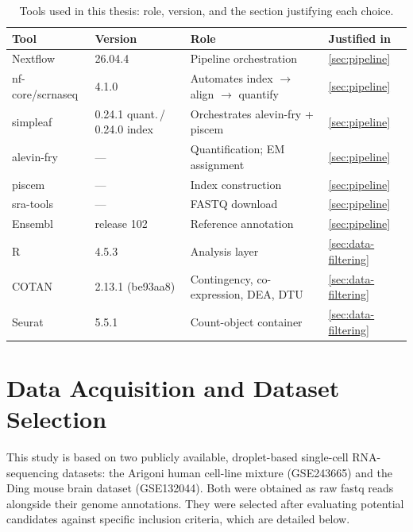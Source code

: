 \begin{table}[htbp]
    \caption{Tools used in this thesis: role, version, and the section justifying each choice.}\label{tab:toolchain}
    \vspace{0.5em}
    \small
    \setlength{\tabcolsep}{5pt}
    \begin{tabular}{@{}l l >{\raggedright\arraybackslash}p{8.5em} l@{}}
        \toprule
        \textbf{Tool} & \textbf{Version} & \textbf{Role} & \textbf{Justified in} \\
        \midrule
        Nextflow & 26.04.4 & Pipeline orchestration & \ref{sec:pipeline} \\
        nf-core/scrnaseq & 4.1.0 & Automates index $\rightarrow$ align $\rightarrow$ quantify & \ref{sec:pipeline} \\
        simpleaf & 0.24.1 quant.\,/\,0.24.0 index & Orchestrates alevin-fry + piscem & \ref{sec:pipeline} \\
        alevin-fry & --- & Quantification; EM assignment & \ref{sec:pipeline} \\
        piscem & --- & Index construction & \ref{sec:pipeline} \\
        sra-tools & --- & FASTQ download & \ref{sec:pipeline} \\
        Ensembl & release 102 & Reference annotation & \ref{sec:pipeline} \\
        R & 4.5.3 & Analysis layer & \ref{sec:data-filtering} \\
        COTAN & 2.13.1 (be93aa8) & Contingency, co-expression, DEA, DTU & \ref{sec:data-filtering} \\
        Seurat & 5.5.1 & Count-object container & \ref{sec:data-filtering} \\
        \bottomrule
    \end{tabular}
\end{table}

\section{Data Acquisition and Dataset Selection}

This study is based on two publicly available, droplet-based single-cell RNA-sequencing datasets: the Arigoni human cell-line mixture (GSE243665\cite{arigoni2024benchmark}) and the Ding mouse brain dataset (GSE132044\cite{ding2020systematic}). Both were obtained as raw \gls{fastq} reads alongside their genome annotations. They were selected after evaluating potential candidates against specific inclusion criteria, which are detailed below.

